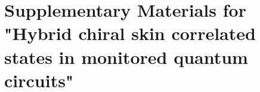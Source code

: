 \documentclass[longbibliography, aps, prx, amsmath, amssymb, amsfonts, twocolumn,superscriptaddress, footinbib]{revtex4-1}
\begin{document}

	

	\newpage
    \section*{Supplementary Materials for "Hybrid chiral skin correlated states in monitored quantum circuits"}
    \setcounter{equation}{0}  %
    \setcounter{figure}{0}  %
    \renewcommand{\theequation}{S\arabic{equation}}  %
    \renewcommand{\thefigure}{S\arabic{figure}}  %

\end{document}
